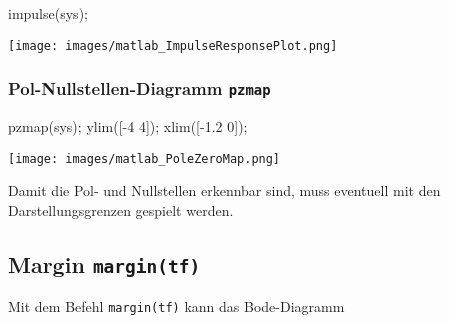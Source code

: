 \documentclass[
  10pt,
  a4paper,
  twocolumn]{article}
\newenvironment{Shaded}{}{}
\newcommand{\FloatTok}[1]{\textcolor[rgb]{0.00,0.36,0.77}{#1}}
\newcommand{\NormalTok}[1]{\textcolor[rgb]{0.14,0.16,0.18}{#1}}
\newcommand{\OperatorTok}[1]{\textcolor[rgb]{0.14,0.16,0.18}{#1}}
\newcommand{\VariableTok}[1]{\textcolor[rgb]{0.89,0.38,0.04}{#1}}
\numberwithin{equation}{section}
\begin{document}
\begin{Shaded}
\begin{Highlighting}[]
\VariableTok{impulse}\NormalTok{(}\VariableTok{sys}\NormalTok{)}\OperatorTok{;}
\end{Highlighting}
\end{Shaded}

\texttt{[image: images/matlab\_ImpulseResponsePlot.png]}

\subsubsection{\texorpdfstring{Pol-Nullstellen-Diagramm
\texttt{pzmap}}{Pol-Nullstellen-Diagramm pzmap}}\label{pol-nullstellen-diagramm-pzmap}

\begin{Shaded}
\begin{Highlighting}[]
\VariableTok{pzmap}\NormalTok{(}\VariableTok{sys}\NormalTok{)}\OperatorTok{;}
\VariableTok{ylim}\NormalTok{([}\OperatorTok{{-}}\FloatTok{4} \FloatTok{4}\NormalTok{])}\OperatorTok{;} \VariableTok{xlim}\NormalTok{([}\OperatorTok{{-}}\FloatTok{1.2} \FloatTok{0}\NormalTok{])}\OperatorTok{;}
\end{Highlighting}
\end{Shaded}

\texttt{[image: images/matlab\_PoleZeroMap.png]}

\begin{tcolorbox}[enhanced jigsaw, coltitle=black, colback=white, breakable, colframe=quarto-callout-caution-color-frame, rightrule=.15mm, left=2mm, opacityback=0, leftrule=.75mm, toptitle=1mm, colbacktitle=quarto-callout-caution-color!10!white, bottomtitle=1mm, arc=.35mm, bottomrule=.15mm, title=\textcolor{quarto-callout-caution-color}{\faFire}\hspace{0.5em}{MATLAB Zauber}, titlerule=0mm, toprule=.15mm, opacitybacktitle=0.6]

Damit die Pol- und Nullstellen erkennbar sind, muss eventuell mit den
Darstellungsgrenzen gespielt werden.

\end{tcolorbox}

\subsection{\texorpdfstring{Margin
\texttt{margin(tf)}}{Margin margin(tf)}}\label{margin-margintf}

Mit dem Befehl \texttt{margin(tf)} kann das Bode-Diagramm
\end{document}
